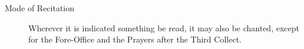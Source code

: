 \begin{description}
\item[Mode of Recitation] Wherever it is indicated something be read, it may also be chanted, except for the Fore-Office and the Prayers after the Third Collect.
\end{description}

